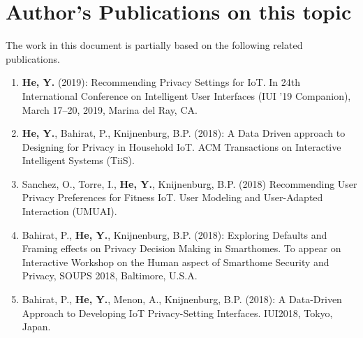 \chapter{Author's Publications on this topic}
\noindent The work in this document is partially based on the following related publications.
\begin{enumerate}
	\item \textbf{He, Y.} (2019): Recommending Privacy Settings for IoT. In 24th International Conference on Intelligent User Interfaces (IUI ’19 Companion), March 17--20, 2019, Marina del Ray, CA.
	
	\item \textbf{He, Y.}, Bahirat, P., Knijnenburg, B.P. (2018): A Data Driven approach to Designing for Privacy in Household IoT. ACM Transactions on Interactive Intelligent Systems (TiiS).
	
	\item Sanchez, O., Torre, I.,\textbf{ He, Y.}, Knijnenburg, B.P. (2018) Recommending User Privacy Preferences for Fitness IoT. User Modeling and User-Adapted Interaction (UMUAI).
	
	\item Bahirat, P., \textbf{He, Y.}, Knijnenburg, B.P. (2018): Exploring Defaults and Framing effects on Privacy Decision Making in Smarthomes.  To appear on Interactive Workshop on the Human aspect of Smarthome Security and Privacy, SOUPS 2018, Baltimore, U.S.A.
	\item Bahirat, P., \textbf{He, Y.}, Menon, A., Knijnenburg, B.P. (2018): A Data-Driven Approach to Developing IoT Privacy-Setting Interfaces. IUI2018, Tokyo, Japan.
	
	
%	
\end{enumerate}